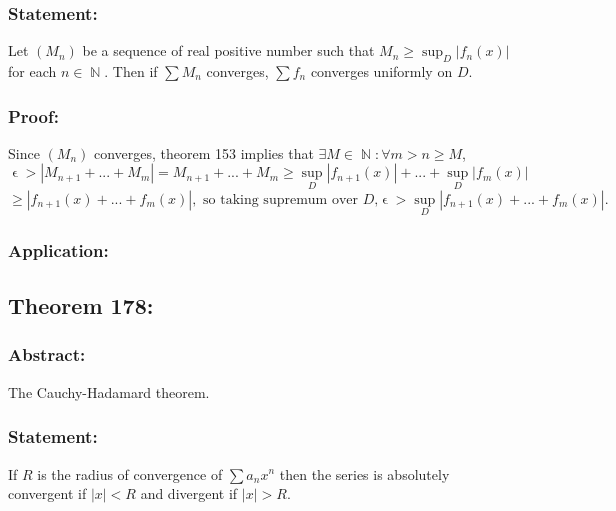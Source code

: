 \documentclass{article}
\DeclareMathOperator\eps{\epsilon}
\DeclareMathOperator\N{\mathbb{N}}
\begin{document}
\subsubsection*{Statement:}
Let $(M_n)$ be a sequence of real positive number such that $M_n \geq \sup_D |f_n(x)|$ for each $n \in \N$.
Then if $\sum M_n$ converges, $\sum f_n$ converges uniformly on $D$.
\subsubsection*{Proof:}
Since $(M_n)$ converges, theorem 153 implies that $\exists M \in \N: \forall m>n \geq M$,
$$
\eps > |M_{n+1}+...+M_{m}| = M_{n+1}+...+M_{m} \geq \sup_D |f_{n+1}(x)|+...+ \sup_D |f_{m}(x)|
$$
$$
\geq |f_{n+1}(x)+...+f_{m}(x)|, \text{ so taking supremum over $D$,} \eps > \sup_D |f_{n+1}(x)+...+f_{m}(x)|.
$$
\subsubsection*{Application:}
\subsection{Theorem 178:}
\subsubsection*{Abstract:}
The Cauchy-Hadamard theorem.
\subsubsection*{Statement:}
If $R$ is the radius of convergence of $\sum a_n x^n$ then the series
is absolutely convergent if $|x|<R$ and divergent if $|x|>R$.
\end{document}
